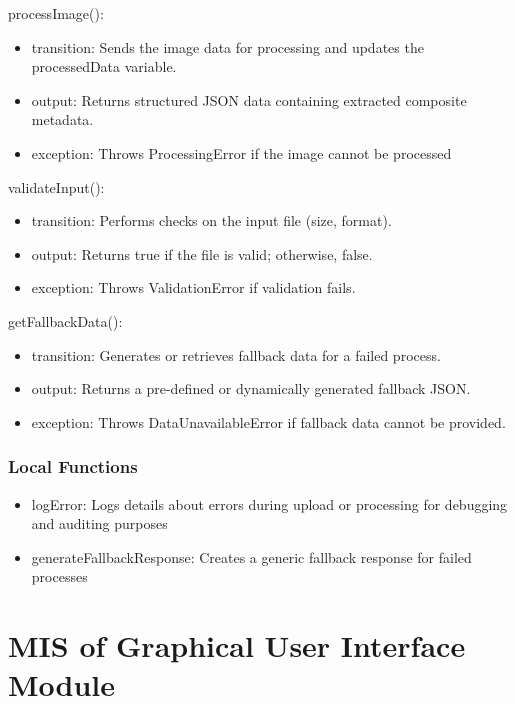 \documentclass[12pt, titlepage]{article}
\begin{document}
\noindent processImage():
\begin{itemize}
\item transition: Sends the image data for processing and updates the processedData variable.
\item output: Returns structured JSON data containing extracted composite metadata.
\item exception: Throws ProcessingError if the image cannot be processed
\end{itemize}

\noindent validateInput():
\begin{itemize}
\item transition: Performs checks on the input file (size, format).
\item output: Returns true if the file is valid; otherwise, false.
\item exception: Throws ValidationError if validation fails.
\end{itemize}

\noindent getFallbackData():
\begin{itemize}
\item transition: Generates or retrieves fallback data for a failed process.
\item output: Returns a pre-defined or dynamically generated fallback JSON.
\item exception: Throws DataUnavailableError if fallback data cannot be provided.
\end{itemize}

\subsubsection{Local Functions}

\begin{itemize}
  \item logError: Logs details about errors during upload or processing for debugging and auditing purposes
  \item generateFallbackResponse: Creates a generic fallback response for failed processes
\end{itemize}

\newpage


\section{MIS of Graphical User Interface Module} \label{Module}
\end{document}
